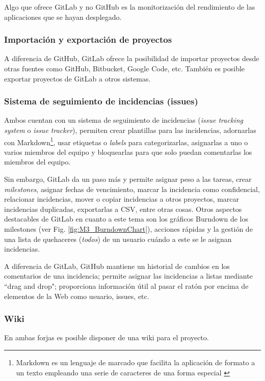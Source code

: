 Algo que ofrece GitLab y no GitHub es la monitorización del rendimiento de las aplicaciones que se hayan desplegado.

\subsubsection{Importación y exportación de proyectos}
A diferencia de GitHub, GitLab ofrece la posibilidad de importar proyectos desde otras fuentes como GitHub, Bitbucket, Google Code, etc. También es posible exportar proyectos de GitLab a otros sistemas.

\subsubsection{Sistema de seguimiento de incidencias (issues)}
Ambos cuentan con un sistema de seguimiento de incidencias (\textit{issue tracking system} o \textit{issue tracker}), permiten crear plantillas para las incidencias, adornarlas con Markdown\footnote{Markdown es un lenguaje de marcado que facilita la aplicación de formato a un texto empleando una serie de caracteres de una forma especial \cite{lasso_que_2013}}, usar etiquetas o \textit{labels} para categorizarlas, asignarlas a uno o varios miembros del equipo y bloquearlas para que solo puedan comentarlas los miembros del equipo.

Sin embargo, GitLab da un paso más y permite asignar peso a las tareas, crear \textit{milestones}, asignar fechas de vencimiento, marcar la incidencia como confidencial, relacionar incidencias, mover o copiar incidencias a otros proyectos, marcar incidencias duplicadas, exportarlas a CSV, entre otras cosas. Otros aspectos destacables de GitLab en cuanto a este tema son los gráficos Burndown de los milestones (ver Fig. \ref{fig:M3_BurndownChart}), acciones rápidas y la gestión de una lista de quehaceres (\textit{todos}) de un usuario cuándo a este se le asignan incidencias.


A diferencia de GitLab, GitHub mantiene un historial de cambios en los comentarios de una incidencia; permite asignar las incidencias a listas mediante ``drag and drop"; proporciona información útil al pasar el ratón por encima de elementos de la Web como usuario, issues, etc.

\subsubsection{Wiki}
En ambas forjas es posible disponer de una wiki para el proyecto.

